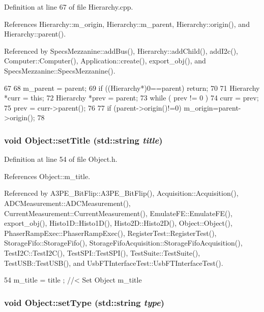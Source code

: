 Definition at line 67 of file Hierarchy.cpp.

References Hierarchy::m\_\-origin, Hierarchy::m\_\-parent, Hierarchy::origin(), and Hierarchy::parent().

Referenced by SpecsMezzanine::addBus(), Hierarchy::addChild(), addI2c(), Computer::Computer(), Application::create(), export\_\-obj(), and SpecsMezzanine::SpecsMezzanine().


\begin{DoxyCode}
67                                               {
68   m_parent = parent;
69   if ((Hierarchy*)0==parent) return;
70 
71   Hierarchy *curr = this;
72   Hierarchy *prev = parent;
73   while ( prev != 0 ){
74     curr = prev;
75     prev = curr->parent();
76   }
77   if (parent->origin()!=0) m_origin=parent->origin();
78 }
\end{DoxyCode}
\hypertarget{classObject_a89557dbbad5bcaa02652f5d7fa35d20f}{
\subsubsection[{setTitle}]{\setlength{\rightskip}{0pt plus 5cm}void Object::setTitle (std::string {\em title})}}
\label{classObject_a89557dbbad5bcaa02652f5d7fa35d20f}


Definition at line 54 of file Object.h.

References Object::m\_\-title.

Referenced by A3PE\_\-BitFlip::A3PE\_\-BitFlip(), Acquisition::Acquisition(), ADCMeasurement::ADCMeasurement(), CurrentMeasurement::CurrentMeasurement(), EmulateFE::EmulateFE(), export\_\-obj(), Histo1D::Histo1D(), Histo2D::Histo2D(), Object::Object(), PhaserRampExec::PhaserRampExec(), RegisterTest::RegisterTest(), StorageFifo::StorageFifo(), StorageFifoAcquisition::StorageFifoAcquisition(), TestI2C::TestI2C(), TestSPI::TestSPI(), TestSuite::TestSuite(), TestUSB::TestUSB(), and UsbFTInterfaceTest::UsbFTInterfaceTest().


\begin{DoxyCode}
54 { m_title = title ; } //< Set Object m_title
\end{DoxyCode}
\hypertarget{classObject_aae534cc9d982bcb9b99fd505f2e103a5}{
\subsubsection[{setType}]{\setlength{\rightskip}{0pt plus 5cm}void Object::setType (std::string {\em type})}}
\label{classObject_aae534cc9d982bcb9b99fd505f2e103a5}


